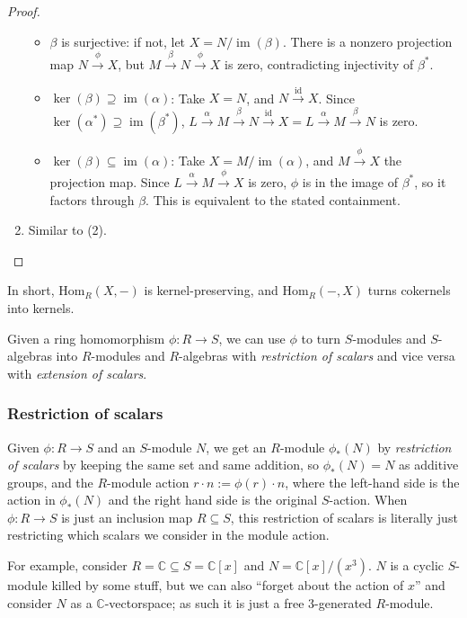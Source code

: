\documentclass{amsart}[12pt]
\def\image{\operatorname{im}}
\def\im{\image}
\def\ker{\operatorname{ker}}
\newcommand{\Hom}{\mathrm{Hom}}
\newcommand{\C}{\mathbb{C}}
\numberwithin{equation}{section}
\theoremstyle{plain} %
\theoremstyle{definition}
\theoremstyle{remark}
\newcommand{\sssec}[1]{\subsubsection{#1}}
\begin{document}
\begin{proof}
\begin{enumerate}
   \begin{itemize}\item $\beta$ is surjective: if not, let $X=N/\im(\beta)$. There is a nonzero projection map $N \xrightarrow{\phi} X$, but $M \xrightarrow{\beta} N \xrightarrow{\phi} X$ is zero, contradicting injectivity of $\beta^*$.
\item  $\ker(\beta)\supseteq \im(\alpha)$: Take $X=N$, and $N\xrightarrow{\mathrm{id}} X$. Since $\ker(\alpha^*)\supseteq \im(\beta^*)$, $L \xrightarrow{\alpha} M \xrightarrow{\beta} N\xrightarrow{\mathrm{id}} X = L \xrightarrow{\alpha} M \xrightarrow{\beta} N$ is zero.
 \item $\ker(\beta)\subseteq \im(\alpha)$: Take $X=M/\im(\alpha)$, and $M \xrightarrow{\phi} X$ the projection map. Since $L \xrightarrow{\alpha} M \xrightarrow{\phi} X$ is zero, $\phi$ is in the image of $\beta^*$, so it factors through $\beta$. This is equivalent to the stated containment.
 \end{itemize}
 
 \item Similar to (2). \qedhere
 
 \end{enumerate}
 
\end{proof}

In short, $\Hom_R(X,-)$ is kernel-preserving, and $\Hom_R(-,X)$ turns cokernels into kernels.

Given a ring homomorphism $\phi:R\to S$, we can use $\phi$ to turn $S$-modules and $S$-algebras into $R$-modules and $R$-algebras with \emph{restriction of scalars} and vice versa with \emph{extension of scalars}.

\sssec{Restriction of scalars}

Given $\phi:R\to S$ and an $S$-module $N$, we get an $R$-module $\phi_*(N)$\index{$\phi_*$} by \emph{restriction of scalars} by keeping the same set and same addition, so $\phi_*(N)=N$ as additive groups, and the $R$-module action $r\cdot  n := \phi(r) \cdot n$, where the left-hand side is the action in $\phi_*(N)$ and the right hand side is the original $S$-action. When $\phi: R\to S$ is just an inclusion map $R\subseteq S$, this restriction of scalars is literally just restricting which scalars we consider in the module action. 

For example, consider $R=\C \subseteq S=\C[x]$ and $N=\C[x]/(x^3)$. $N$ is a cyclic $S$-module killed by some stuff, but we can also ``forget about the action of $x$'' and consider $N$ as a $\C$-vectorspace; as such it is just a free $3$-generated $R$-module.
\end{document}
